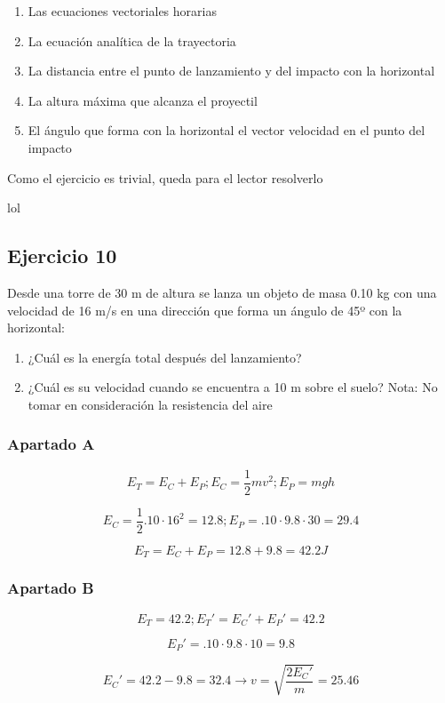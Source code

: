 \begin{enumerate}[label=\Alph*)]
  \item Las ecuaciones vectoriales horarias
  \item La ecuación analítica de la trayectoria
  \item La distancia entre el punto de
  lanzamiento y del impacto con la horizontal
  \item La altura máxima que alcanza el proyectil
  \item El ángulo que forma con la horizontal el vector
  velocidad en el punto del impacto
\end{enumerate}

Como el ejercicio es trivial, queda para el lector
resolverlo

lol

\subsection{Ejercicio 10}
Desde una torre de 30 m de altura se lanza un
objeto de masa 0.10 kg con una velocidad de
16 m/s en una dirección que forma un ángulo de
45º con la horizontal:

\begin{enumerate}[label=\Alph*)]
  \item ¿Cuál es la energía total después del lanzamiento?
  \item ¿Cuál es su velocidad cuando se encuentra a 10 m
  sobre el suelo? Nota: No tomar en consideración la
  resistencia del aire
\end{enumerate}

\subsubsection{Apartado A}
  $$
  E_T = E_C + E_P; E_C = \frac{1}{2}mv^2; E_P = mgh
  $$

  $$
  E_C = \frac{1}{2}.10\cdot16^2 = 12.8;
  E_P = .10\cdot9.8\cdot30 = 29.4
  $$

  $$
  E_T = E_C + E_P = 12.8 + 9.8 = 42.2J
  $$

\subsubsection{Apartado B}
  $$
  E_T = 42.2; E_T' = E_C' + E_P' = 42.2
  $$

  $$
  E_P' = .10\cdot9.8\cdot10 = 9.8
  $$

  $$
  E_C' = 42.2 - 9.8 = 32.4
  \rightarrow v = \sqrt{\frac{2E_C'}{m}} = 25.46
  $$